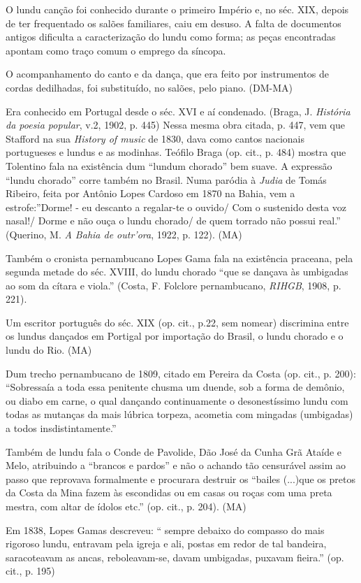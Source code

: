 O lundu canção foi conhecido durante o primeiro Império e, no séc. XIX,
depois de ter frequentado os salões familiares, caiu em desuso. A falta
de documentos antigos dificulta a caracterização do lundu como forma; as
peças encontradas apontam como traço comum o emprego da síncopa.

O acompanhamento do canto e da dança, que era feito por instrumentos de
cordas dedilhadas, foi substituído, no salões, pelo piano. (DM-MA)

Era conhecido em Portugal desde o séc. XVI e aí condenado. (Braga, J.
\emph{História da poesia popular}, v.2, 1902, p. 445) Nessa mesma obra
citada, p. 447, vem que Stafford na sua \emph{History of music} de 1830,
dava como cantos nacionais portugueses e lundus e as modinhas. Teófilo
Braga (op. cit., p. 484) mostra que Tolentino fala na existência dum
``lundum chorado'' bem suave. A expressão ``lundu chorado'' corre também
no Brasil. Numa paródia à \emph{Judia} de Tomás Ribeiro, feita por
Antônio Lopes Cardoso em 1870 na Bahia, vem a estrofe:''Dorme! - eu
descanto a regalar-te o ouvido/ Com o sustenido desta voz nasal!/ Dorme
e não ouça o lundu chorado/ de quem torrado não possui real.'' (Querino,
M. \emph{A Bahia de outr'ora}, 1922, p. 122). (MA)

Também o cronista pernambucano Lopes Gama fala na existência praceana,
pela segunda metade do séc. XVIII, do lundu chorado ``que se dançava às
umbigadas ao som da cítara e viola.'' (Costa, F. Folclore pernambucano,
\emph{RIHGB}, 1908, p. 221).

Um escritor português do séc. XIX (op. cit., p.22, sem nomear)
discrimina entre os lundus dançados em Portigal por importação do
Brasil, o lundu chorado e o lundu do Rio. (MA)

Dum trecho pernambucano de 1809, citado em Pereira da Costa (op. cit.,
p. 200): ``Sobressaía a toda essa penitente chusma um duende, sob a
forma de demônio, ou diabo em carne, o qual dançando continuamente o
desonestíssimo lundu com todas as mutanças da mais lúbrica torpeza,
acometia com mingadas (umbigadas) a todos insdistintamente.''

Também de lundu fala o Conde de Pavolide, Dão José da Cunha Grã Ataíde e
Melo, atribuindo a ``brancos e pardos'' e não o achando tão censurável
assim ao passo que reprovava formalmente e procurara destruir os
``bailes (...)que os pretos da Costa da Mina fazem às escondidas ou em
casas ou roças com uma preta mestra, com altar de ídolos etc.'' (op.
cit., p. 204). (MA)

Em 1838, Lopes Gamas descreveu: `` sempre debaixo do compasso do mais
rigoroso lundu, entravam pela igreja e ali, postas em redor de tal
bandeira, saracoteavam as ancas, reboleavam-se, davam umbigadas, puxavam
fieira.'' (op. cit., p. 195)

